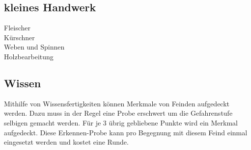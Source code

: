 \documentclass[a4paper,12pt,oneside]{book}
\begin{document}
\subsection{kleines Handwerk}
\begin{description}
\item[Fleischer]
\item[Kürschner]
\item[Weben und Spinnen]
\item[Holzbearbeitung]
\end{description}
\subsection{Wissen}
Mithilfe von Wissensfertigkeiten können Merkmale von Feinden aufgedeckt werden. Dazu muss in der Regel eine Probe erschwert um die Gefahrenstufe selbigen gemacht werden. Für je 3 übrig gebliebene Punkte wird ein Merkmal aufgedeckt. Diese Erkennen-Probe kann pro Begegnung mit diesem Feind einmal eingesetzt werden und kostet eine Runde.
\end{document}
